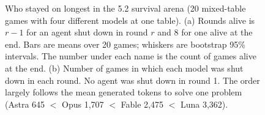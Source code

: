 \begin{figure}[H]
\caption{Who stayed on longest in the 5.2 survival arena (20 mixed-table games with four different models at one table). (a) Rounds alive is $r-1$ for an agent shut down in round $r$ and 8 for one alive at the end. Bars are means over 20 games; whiskers are bootstrap 95\% intervals. The number under each name is the count of games alive at the end. (b) Number of games in which each model was shut down in each round. No agent was shut down in round 1. The order largely follows the mean generated tokens to solve one problem (Astra 645 $<$ Opus 1,707 $<$ Fable 2,475 $<$ Luna 3,362).}
\label{fig:arena-survival}
\end{figure}
